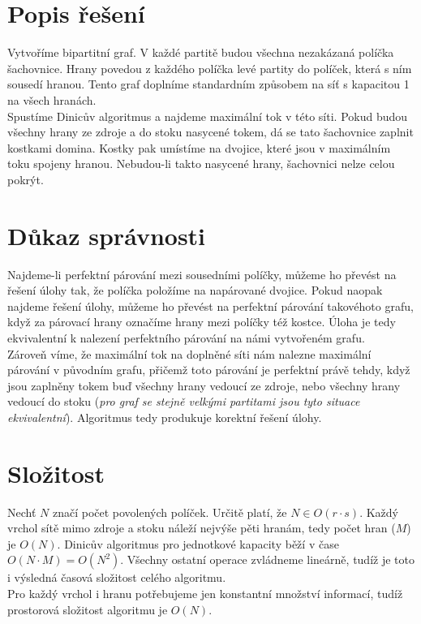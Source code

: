 \documentclass{scrartcl}
\begin{document}
\section{Popis řešení}

Vytvoříme bipartitní graf. V každé partitě budou všechna nezakázaná políčka šachovnice. Hrany povedou z každého políčka levé partity do políček, která s ním sousedí hranou. Tento graf doplníme standardním způsobem na síť s kapacitou 1 na všech hranách. \\

Spustíme Dinicův algoritmus a najdeme maximální tok v této síti. Pokud budou všechny hrany ze zdroje a do stoku nasycené tokem, dá se tato šachovnice zaplnit kostkami domina. Kostky pak umístíme na dvojice, které jsou v maximálním toku spojeny hranou. Nebudou-li takto nasycené hrany, šachovnici nelze celou pokrýt.

\section{Důkaz správnosti}

Najdeme-li perfektní párování mezi sousedními políčky, můžeme ho převést na řešení úlohy tak, že políčka položíme na napárované dvojice. Pokud naopak najdeme řešení úlohy, můžeme ho převést na perfektní párování takovéhoto grafu, když za párovací hrany označíme hrany mezi políčky též kostce. Úloha je tedy ekvivalentní k nalezení perfektního párování na námi vytvořeném grafu. \\

Zároveň víme, že maximální tok na doplněné síti nám nalezne maximální párování v původním grafu, přičemž toto párování je perfektní právě tehdy, když jsou zaplněny tokem buď všechny hrany vedoucí ze zdroje, nebo všechny hrany vedoucí do stoku (\textit{pro graf se stejně velkými partitami jsou tyto situace ekvivalentní}). Algoritmus tedy produkuje korektní řešení úlohy.

\section{Složitost}
Nechť $N$ značí počet povolených políček. Určitě platí, že $N \in O(r \cdot s)$. Každý vrchol sítě mimo zdroje a stoku náleží nejvýše pěti hranám, tedy počet hran ($M$) je $O(N)$. Dinicův algoritmus pro jednotkové kapacity běží v čase $O(N \cdot M) = O(N^2)$. Všechny ostatní operace zvládneme lineárně, tudíž je toto i výsledná časová složitost celého algoritmu. \\

Pro každý vrchol i hranu potřebujeme jen konstantní množství informací, tudíž prostorová složitost algoritmu je $O(N)$.
\end{document}
